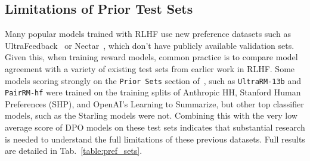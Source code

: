 \subsection{Limitations of Prior Test Sets} \label{sec:limit2}
Many popular models trained with RLHF use new preference datasets such as UltraFeedback~\citep{cui2023ultrafeedback} or Nectar~\citep{starling2023}, which don't have publicly available validation sets. 
Given this, when training reward models, common practice is to compare model agreement with a variety of existing test sets from earlier work in RLHF.
Some models scoring strongly on the \texttt{Prior Sets} section of~\name, such as \texttt{UltraRM-13b} and \texttt{PairRM-hf} were trained on the training splits of Anthropic HH, Stanford Human Preferences (SHP), and OpenAI's Learning to Summarize, but other top classifier models, such as the Starling models were not.
Combining this with the very low average score of DPO models on these test sets indicates that substantial research is needed to understand the full limitations of these previous datasets.
Full results are detailed in Tab.~\ref{table:pref_sets}.




